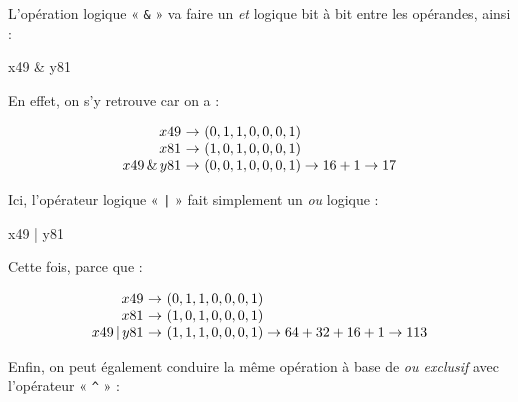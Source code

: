 
L'opération logique « \texttt{\&} » va faire un \textit{et} logique bit à bit entre les opérandes, ainsi :

\begin{idleconsole}
	\begin{pyconsole}
		x49 & y81
	\end{pyconsole}
\end{idleconsole}

En effet, on s'y retrouve car on a :

\vspace{-0.7\baselineskip}
\begin{equation}
\begin{array}{r@{~}c@{~}l}
x49 & \rightarrow & (0, 1, 1, 0, 0, 0, 1) \\
x81 & \rightarrow & (1, 0, 1, 0, 0, 0, 1) \\
x49\, \&\, y81 &\rightarrow & (0, 0, 1, 0, 0, 0, 1) \rightarrow 16 + 1 \rightarrow 17
\end{array}
\end{equation}
\vspace{-0.75\baselineskip}

Ici, l'opérateur logique « \texttt{|} » fait simplement un \textit{ou} logique :

\begin{idleconsole}
	\begin{pyconsole}
		x49 | y81
	\end{pyconsole}
\end{idleconsole}

Cette fois, parce que :

\vspace{-0.75\baselineskip}

\begin{equation}
\begin{array}{r@{~}c@{~}l}
x49 & \rightarrow & (0, 1, 1, 0, 0, 0, 1) \\
x81 & \rightarrow & (1, 0, 1, 0, 0, 0, 1) \\
x49\, | \, y81 &\rightarrow & (1, 1, 1, 0, 0, 0, 1) \rightarrow 64 + 32 + 16 + 1 \rightarrow 113
\end{array}
\end{equation}
\vspace{-0.75\baselineskip}

Enfin, on peut également conduire la même opération à base de \textit{ou exclusif} avec l'opérateur « \texttt{\^{}} » :

